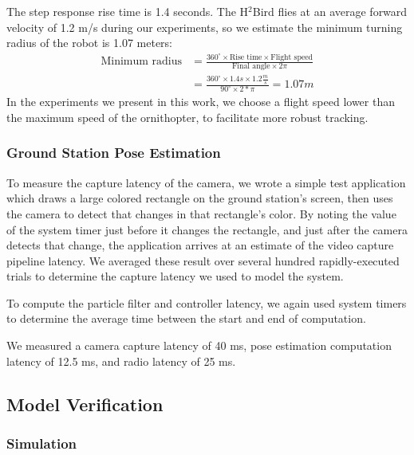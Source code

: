 \documentclass{aamas2013}
\begin{document}
The step response rise time is 1.4 seconds. The H$^2$Bird flies at an 
average forward velocity of 1.2 m/s during our experiments, so we estimate 
the minimum turning radius of the robot is 1.07 meters:
\begin{equation}
\label{eq:min_radius}
\begin{aligned}
\text{Minimum radius} & = \frac{360^{\circ}\times\text{Rise time}\times\text{Flight
speed}}{\text{Final angle}\times 2\pi}\\
& = \frac{360^{\circ}\times 1.4s\times 1.2\frac{m}{s}}{90^{\circ}\times2*\pi} = 1.07 m
\end{aligned}
\end{equation}
In the experiments we present in this work, we choose a flight speed lower 
than the maximum speed of the ornithopter, to facilitate more robust 
tracking.

\subsubsection{Ground Station Pose Estimation}
To measure the capture latency of the camera, we wrote a simple test 
application which draws a large colored rectangle on the ground station's 
screen, then uses the camera to detect that changes in that rectangle's 
color. By noting the value of the system timer just before it changes the 
rectangle, and just after the camera detects that change, the application 
arrives at an estimate of the video capture pipeline latency. We averaged 
these result over several hundred rapidly-executed trials to determine the 
capture latency we used to model the system.

To compute the particle filter and controller latency, we again used system 
timers to determine the average time between the start and end of computation.

We measured a camera capture latency of 40 ms, pose estimation computation 
latency of 12.5 ms, and radio latency of 25 ms.
\subsection{Model Verification}

\subsubsection{Simulation}
\end{document}
